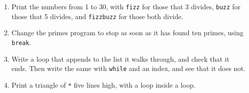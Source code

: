 \begin{tryit}
\begin{enumerate}
\item Print the numbers from 1 to 30, with \verb|fizz| for those that 3
  divides, \verb|buzz| for those that 5 divides, and \verb|fizzbuzz| for
  those both divide.
\item Change the primes program to stop as soon as it has found ten
  primes, using \verb|break|.
\item Write a loop that appends to the list it walks through, and check
  that it ends. Then write the same with \verb|while| and an index,
  and see that it does not.
\item Print a triangle of \verb|*| five lines high, with a loop inside
  a loop.
\end{enumerate}
\end{tryit}
